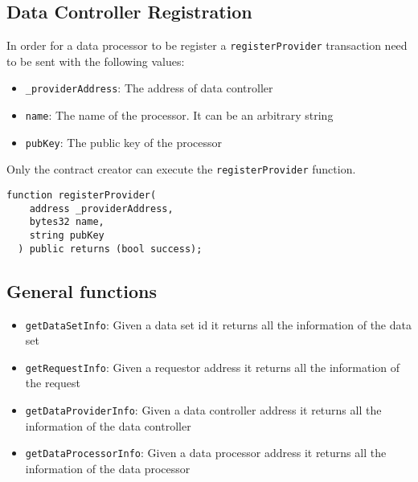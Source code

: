 \subsection{Data Controller Registration}
\label{implemenation:contracts:reg_processor}

In order for a data processor to be register a \verb|registerProvider| transaction need to be sent with the following values:

\begin{itemize}
  \item \verb|_providerAddress|: The address of data controller
  \item \verb|name|: The name of the processor. It can be an arbitrary string
  \item \verb|pubKey|: The public key of the processor
\end{itemize}

Only the contract creator can execute the \verb|registerProvider| function.

\begin{lstlisting}[language=Solidity, caption={Data controller registration function}]
  function registerProvider(
    address _providerAddress,
    bytes32 name,
    string pubKey
  ) public returns (bool success);
\end{lstlisting}

\subsection{General functions}
\label{implemenation:contracts:general}

\begin{itemize}
  \item \verb|getDataSetInfo|: Given a data set id it returns all the information of the data set
  \item \verb|getRequestInfo|: Given a requestor address it returns all the information of the request
  \item \verb|getDataProviderInfo|: Given a data controller address it returns all the information of the data controller
  \item \verb|getDataProcessorInfo|: Given a data processor address it returns all the information of the data processor
\end{itemize}

